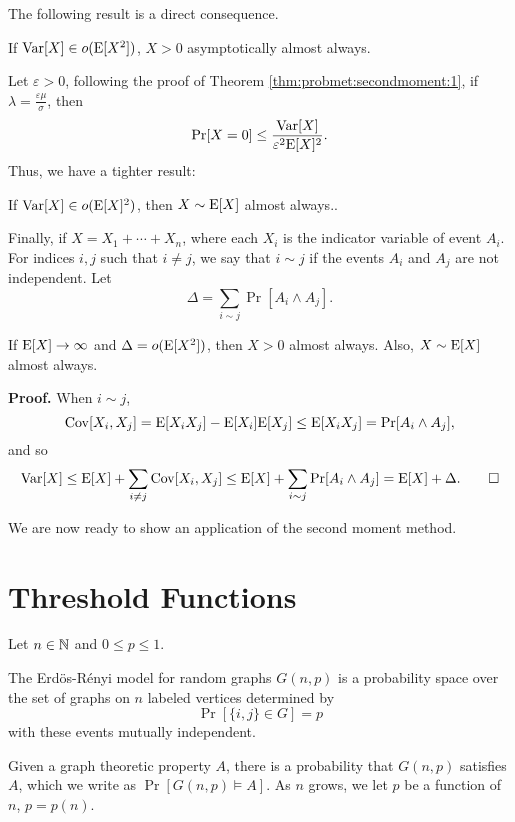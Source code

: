 The following result is a direct consequence. 

\begin{corollary}\label{cor:probmet:secondmoment:1}
    If $\mathrm{Var}[X] \in o(\mathrm{E}[X^2])$, $X > 0$ asymptotically almost always. 
\end{corollary}

Let $\varepsilon > 0$, following the proof of Theorem \ref{thm:probmet:secondmoment:1}, if $\lambda = \frac{\varepsilon\mu}{\sigma}$, then
\[\mathrm{Pr}[X = 0] \leq \frac{\mathrm{Var}[X]}{\varepsilon^2\mathrm{E}[X]^2}.\]
Thus, we have a tighter result:
\begin{corollary}\label{cor:probmet:secondmoment:2}
    If $\mathrm{Var}[X] \in o(\mathrm{E}[X]^2)$, then $X \sim \mathrm{E}[X]$ almost always.. 
\end{corollary}

Finally, if $X = X_1 + \cdots + X_n$, where each $X_i$ is the indicator variable of event $A_i$. For indices $i, j$ such that $i \neq j$, we say that $i \sim j$ if the events $A_i$ and $A_j$ are not independent. Let
\[\Delta  = \sum_{i \sim j} \Pr[A_i \wedge A_j].\]
\begin{corollary}\label{cor:probmet:secondmoment:3}
    If $\mathrm{E}[X] \to \infty$ and $\Delta = o(\mathrm{E}[X^2])$, then $X > 0$ almost always. Also, $X \sim \mathrm{E}[X]$ almost always.
\end{corollary}
\textbf{Proof. } When $i \sim j$, 
\[\mathrm{Cov}[X_i, X_j] = \mathrm{E}[X_iX_j] - \mathrm{E}[X_i]\mathrm{E}[X_j] \leq \mathrm{E}[X_iX_j] = \mathrm{Pr}[A_i \wedge A_j],\]
and so 
\[\mathrm{Var}[X] \leq \mathrm{E}[X] + \sum_{i \neq j}\mathrm{Cov}[X_i, X_j] \leq \mathrm{E}[X] + \sum_{i \sim j}\mathrm{Pr}[A_i \wedge A_j] = \mathrm{E}[X] + \Delta. \qed\]

We are now ready to show an application of the second moment method. \par
\section{Threshold Functions}\label{sec:probmet:threshold}

Let $n \in \mathbb{N}$ and $0 \leq p \leq 1$. 
\begin{definition}
    The Erdös-Rényi model for random graphs $G(n, p)$ is a probability space over the set of graphs on $n$ labeled vertices determined by
    \[\Pr[\{i, j\} \in G] = p\] 
    with these events mutually independent.
\end{definition}
 Given a graph theoretic property $A$, there is a probability that $G(n, p)$ satisfies $A$, which we write as $\Pr[G(n, p) \vDash A]$. As $n$ grows, we let $p$ be a function of $n$, $p = p(n)$. \par

